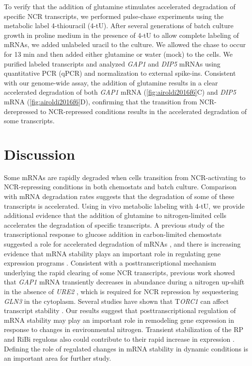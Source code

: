To verify
that the addition of glutamine stimulates accelerated degradation of
specific NCR transcripts, we performed pulse-chase experiments using
the metabolic label 4-thiouracil (4-tU). After several generations of
batch culture growth in proline medium in the presence of 4-tU to
allow complete labeling of mRNAs, we added unlabeled uracil to the
culture. We allowed the chase to occur for 13 min and then added
either glutamine or water (mock) to the cells. We purified labeled
transcripts and analyzed \textit{GAP1} and \textit{DIP5} 
mRNAs using quantitative PCR
(qPCR) and normalization to external spike-ins. Consistent with our
genome-wide assay, the addition of glutamine results in a clear
accelerated degradation of both \textit{GAP1} mRNA 
(\autoref{fig:airoldi2016f6}C)
and \textit{DIP5} mRNA (\autoref{fig:airoldi2016f6}D), 
confirming that the transition from NCR-derepressed to
NCR-repressed conditions results in the accelerated degradation of
some transcripts.  

\section{Discussion} 

Some mRNAs are rapidly degraded when cells
transition from NCR-activating to NCR-repressing conditions in both
chemostats and batch culture. Comparison with mRNA degradation rates
suggests that the degradation of some of these transcripts is
accelerated. Using in vivo metabolic labeling with 4-tU, we provide
additional evidence that the addition of glutamine to nitrogen-limited
cells accelerates the degradation of specific transcripts. A previous
study of the transcriptional response to glucose addition in
carbon-limited chemostats suggested a role for accelerated degradation
of mRNAs 
\parencite{kresnowati2006}
, and there is increasing evidence
that mRNA stability plays an important role in regulating gene
expression programs 
\parencite{puig2005coordinate,bennett2008metabolic,baumgartner2011antagonistic}. 
Consistent with a posttranscriptional
mechanism underlying the rapid clearing of some NCR transcripts,
previous work showed that \textit{GAP1} mRNA transiently decreases in abundance
during a nitrogen up-shift in the absence of \textit{URE2} 
\parencite{ter1998repression}, 
which is required for NCR repression by sequestering \textit{GLN3} in
the cytoplasm. Several studies have shown that T\textit{ORC1} can affect
transcript stability 
\parencite{albig2001target,munchel2011dynamic}.
Our results suggest that posttranscriptional regulation of mRNA
stability may play an important role in remodeling gene expression in
response to changes in environmental nitrogen. Transient stabilization
of the RP and RiBi regulons also could contribute to their rapid
increase in expression 
\parencite{yin2003glucose}. Defining the role of
regulated changes in mRNA stability in dynamic conditions is an
important area for further study. 

